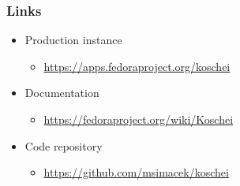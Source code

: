 \documentclass[pdftex,unicode,xcolor=table]{beamer}
\begin{document}
\begin{frame}
  \frametitle{Links}
  \begin{itemize}
    \item Production instance
    \begin{itemize}
      \item \url{https://apps.fedoraproject.org/koschei}
    \end{itemize}
    \item Documentation
    \begin{itemize}
      \item \url{https://fedoraproject.org/wiki/Koschei}
    \end{itemize}
    \item Code repository
    \begin{itemize}
      \item \url{https://github.com/msimacek/koschei}
    \end{itemize}
  \end{itemize}
\end{frame}


 {
  \Rhbg{\frame{\theend}}
}
\end{document}
